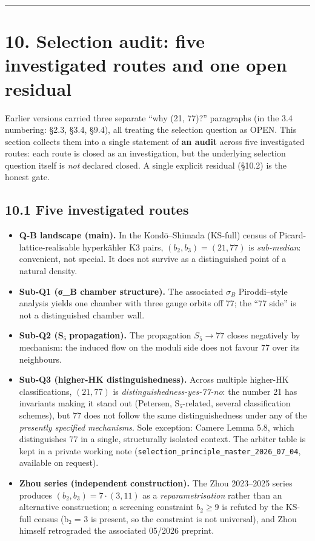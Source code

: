 \documentclass[11pt,a4paper]{article}
\begin{document}
\begin{center}\rule{\linewidth}{0.5pt}\end{center}

\section{10. Selection audit: five investigated routes and one open residual}\label{selection-audit-five-investigated-routes-and-one-open-residual}

Earlier versions carried three separate ``why (21, 77)?'' paragraphs (in the 3.4 numbering: §2.3, §3.4, §9.4), all treating the selection question as OPEN. This section collects them into a single statement of \textbf{an audit} across five investigated routes: each route is closed as an investigation, but the underlying selection question itself is \emph{not} declared closed. A single explicit residual (§10.2) is the honest gate.

\subsection{10.1 Five investigated routes}\label{five-investigated-routes}

\begin{itemize}
\tightlist
\item
  \textbf{Q-B landscape (main).} In the Kondō--Shimada (KS-full) census of Picard-lattice-realisable hyperkähler K3 pairs, \((b_2, b_3) = (21, 77)\) is \emph{sub-median}: convenient, not special. It does not survive as a distinguished point of a natural density.
\item
  \textbf{Sub-Q1 (σ\_\allowbreak{}B chamber structure).} The associated \(\sigma_B\) Piroddi--style analysis yields one chamber with three gauge orbits off 77; the ``77 side'' is not a distinguished chamber wall.
\item
  \textbf{Sub-Q2 (S₅ propagation).} The propagation \(S_5 \to 77\) closes negatively by mechanism: the induced flow on the moduli side does not favour 77 over its neighbours.
\item
  \textbf{Sub-Q3 (higher-HK distinguishedness).} Across multiple higher-HK classifications, \((21, 77)\) is \emph{distinguishedness-yes-77-no}: the number 21 has invariants making it stand out (Petersen, S₅-related, several classification schemes), but 77 does not follow the same distinguishedness under any of the \emph{presently specified mechanisms}. Sole exception: Camere Lemma 5.8, which distinguishes 77 in a single, structurally isolated context. The arbiter table is kept in a private working note (\texttt{selection\_\allowbreak{}principle\_\allowbreak{}master\_\allowbreak{}2026\_\allowbreak{}07\_\allowbreak{}04}, available on request).
\item
  \textbf{Zhou series (independent construction).} The Zhou 2023--2025 series produces \((b_2, b_3) = 7 \cdot (3, 11)\) as a \emph{reparametrisation} rather than an alternative construction; a screening constraint \(b_2 \ge 9\) is refuted by the KS-full census (b₂ = 3 is present, so the constraint is not universal), and Zhou himself retrograded the associated 05/2026 preprint.
\end{itemize}
\end{document}

